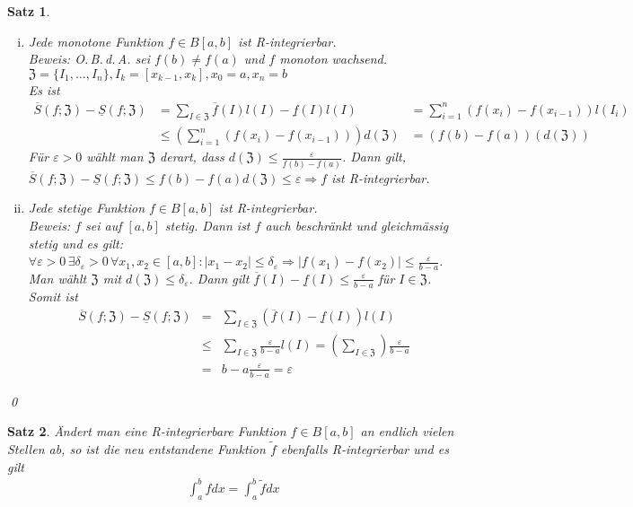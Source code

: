 \documentclass[ngerman,titlepage,twoside, parskip=half*]{scrreprt}
\newcommand*{\ZZ}{\mathfrak{Z}}
\theoremstyle{plain}
\newtheorem{theorem}{Satz}[section]
\theoremstyle{definition}
\theoremstyle{remark}
\newcommand*{\abs}[2][]{#1\lvert#2#1\rvert}
\begin{document}
\begin{theorem}
  \begin{enumerate}[(i)]
    \item Jede \emph{monotone} Funktion $f\in B[a,b]$ ist R-integrierbar.\\
      \textit{Beweis}: O.\,B.\,d.\,A. sei $f(b)\neq f(a)$ und $f$ monoton wachsend.
      $\ZZ=\{I_1,\dots,I_n\}, I_k=[x_{k-1},x_k], x_0=a,x_n=b$\\
      Es ist
      \begin{align*}
        \overline{S}(f;\ZZ)-\underline{S}(f;\ZZ)&= \sum_{I\in\ZZ} \overline{f}
        (I)l(I)-\underline{f}(I)l(I)
        &= \sum_{i=1}^n (f(x_i)-f(x_{i-1}))l(I_i)\\
        &\leq \left( \sum_{i=1}^n (f(x_i)-f(x_{i-1})) \right)d(\ZZ)
        &= (f(b)-f(a))(d(\ZZ))
      \end{align*}
      Für $\varepsilon>0$ wählt man $\ZZ$ derart, dass $d(\ZZ)\leq
      \frac{\varepsilon}{f(b)-f(a)}$. Dann gilt, $\overline{S}(f;\ZZ)-
      \underline{S}(f;\ZZ)\leq f(b)-f(a)d(\ZZ)\leq \varepsilon\Rightarrow f$
      ist R-integrierbar.
    \item Jede \emph{stetige} Funktion $f\in B[a,b]$ ist R-integrierbar.\\
      \textit{Beweis}: $f$ sei auf $[a,b]$ stetig. Dann ist $f$ auch beschränkt
      und gleichmässig stetig und es gilt:
      $\forall\varepsilon>0\,\exists\delta_\varepsilon>0\,\forall x_1,x_2\in
      [a,b]\colon \abs{x_1-x_2}\leq\delta_\varepsilon\Rightarrow\abs{f(x_1)-f(x_2)}\leq
      \frac{\varepsilon}{b-a}$. Man wählt $\ZZ$ mit $d(\ZZ)\leq
      \delta_\varepsilon$. Dann gilt $\overline{f}(I)-\underline{f}(I)\leq
      \frac{\varepsilon}{b-a}$ für $I \in\ZZ$. Somit ist
      \begin{align*}
        \overline{S}(f;\ZZ)-\underline{S}(f;\ZZ)&=& \sum_{I\in\ZZ}
        (\overline{f}(I)-\underline{f}(I))l(I)\\
        &\leq& \sum_{I\in\ZZ} \frac{\varepsilon}{b-a} l(I)=\left( \sum_{I\in\ZZ}
        \right)\frac{\varepsilon}{b-a}\\
        &=& b-a\frac{\varepsilon}{b-a}=\varepsilon
      \end{align*}
  \end{enumerate}
  \qed
\end{theorem}

\begin{theorem}
  Ändert man eine R-integrierbare Funktion $f\in B[a,b]$ an endlich vielen
  Stellen ab, so ist die neu entstandene Funktion $\tilde{f}$ ebenfalls
  R-integrierbar und es gilt
  \begin{gather*}\int_a^b fdx = \int_a^b \tilde{f}dx\end{gather*}
\end{theorem}
\end{document}
